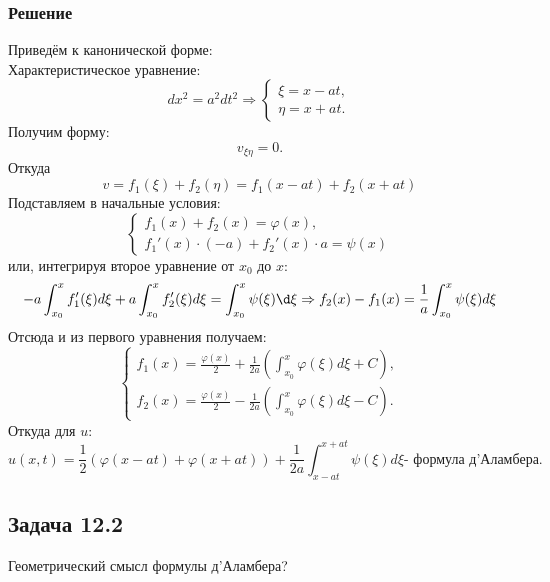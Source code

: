 \documentclass[11pt]{article}
\begin{document}
\subsubsection{Решение}
\label{sec:orge0932f4}
Приведём к канонической форме:\\
Характеристическое уравнение:
\begin{equation}
dx^2 = a^2dt^2 \Rightarrow
\begin{cases}
\xi = x - at, \\
\eta = x + at.
\end{cases}
\end{equation}
Получим форму:
\begin{equation}
v_{\xi\eta} = 0.
\end{equation}
Откуда
\begin{equation}
v = f_1(\xi) + f_2(\eta) = f_1(x - at) + f_2(x + at)
\end{equation}
Подставляем в начальные условия:
\begin{equation}
\begin{cases}
f_1(x) + f_2(x) = \varphi(x), \\
f_1'(x)\cdot(-a) + f_2'(x)\cdot a = \psi(x)
\end{cases}
\end{equation}
или, интегрируя второе уравнение от $x_0$ до $x$:
\begin{equation}
-a\int_{x_0}^xf_1'(\xi)d\xi + a\int_{x_0}^xf_2'(\xi)d\xi = \int_{x_0}^x\psi(\xi)\d\xi
\Rightarrow
f_2(x) - f_1(x) = \frac1a\int_{x_0}^x\psi(\xi)d\xi
\end{equation}
Отсюда и из первого уравнения получаем:
\begin{equation}
\begin{cases}
f_1(x) = \frac{\varphi(x)}2 + \frac1{2a}\left(\int_{x_0}^x\varphi(\xi)d\xi + C\right), \\
f_2(x) = \frac{\varphi(x)}2 - \frac1{2a}\left(\int_{x_0}^x\varphi(\xi)d\xi - C\right).
\end{cases}
\end{equation}
Откуда для $u$:
\begin{equation}
u(x, t) = \frac12(\varphi(x - at) + \varphi(x + at)) + \frac1{2a}\int_{x - at}^{x + at}\psi(\xi)d\xi \text{- формула д'Аламбера.}
\end{equation}
\subsection{Задача 12.2}
\label{sec:org0d808d0}
Геометрический смысл формулы д'Аламбера?
\end{document}
